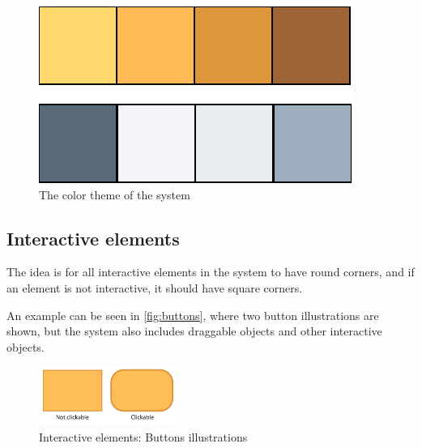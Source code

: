 \begin{figure}[h!]
	\centering
	\includegraphics[width=\textwidth]{gfx/design_color_theme}
	\caption{The color theme of the \giraf[] system}
	\label{fig:colortheme}
\end{figure}

\subsection*{Interactive elements}
\label{design:button_design}

The idea is for all interactive elements in the \giraf[] system to have round corners, and if an element is not interactive, it should have square corners.

An example can be seen in \autoref{fig:buttons}, where two button illustrations are shown, but the system also includes draggable objects and other interactive objects.

\begin{figure}[h!]
	\centering
	\includegraphics[width=0.4\textwidth]{gfx/buttons.pdf}
	\caption{Interactive elements: Buttons illustrations}
	\label{fig:buttons}
\end{figure}